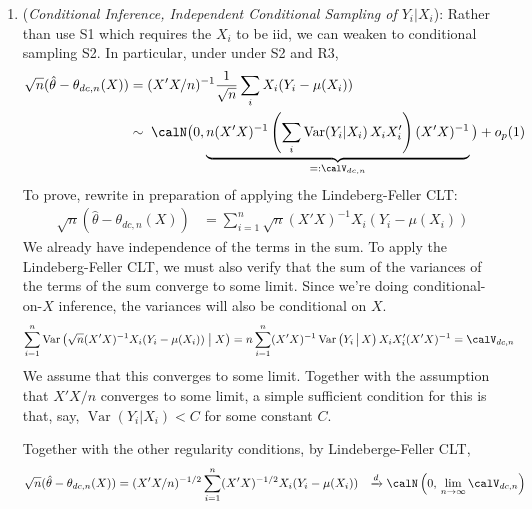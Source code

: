 \documentclass[12pt]{article}
\theoremstyle{plain}
\theoremstyle{definition}
\theoremstyle{remark}
\newcommand{\ra}{\rightarrow}
\newcommand{\Var}{\operatorname{Var}}
\newcommand{\dto}{\xrightarrow{d}}
\newcommand{\sumin}{\sum^n_{i=1}}
\begin{document}
\begin{enumerate}
  \item
    (\emph{Conditional Inference, Independent Conditional Sampling of $Y_i|X_i$}):
    Rather than use S1 which requires the $X_i$ to be iid, we can weaken
    to conditional sampling S2.
    In particular, under under S2 and R3,
    \begin{align*}
      \sqrt{n}(\hat{\theta}-\theta_{dc,n}(X))
      &=
      (X'X/n)^{-1}
      \frac{1}{\sqrt{n}}
      \sum_i
      X_i
        (Y_i-\mu(X_i))
      \\
      &\sim
      \;
      \calN\big(
        0,
        \underbrace{%
          n(X'X)^{-1}
          \left(
          \sum_i
          \Var(Y_i|X_i)\,X_iX_i'
          \right)
          (X'X)^{-1}
        }_{=:\calV_{dc,n}}
      \big)
      +
      o_p(1)
    \end{align*}
    To prove, rewrite in preparation of applying the Lindeberg-Feller
    CLT:
    \begin{align*}
      \sqrt{n}(\hat{\theta}-\theta_{dc,n}(X))
      &=
      \sumin
      \sqrt{n}
      (X'X)^{-1}
      X_i
      (Y_i-\mu(X_i))
    \end{align*}
    We already have independence of the terms in the sum.
    To apply the Lindeberg-Feller CLT, we must also verify that the sum
    of the variances of the terms of the sum converge to some limit.
    Since we're doing conditional-on-$X$ inference, the variances will
    also be conditional on $X$.
    \begin{align*}
      \sumin
      \Var\left(
      \sqrt{n}
      (X'X)^{-1}
      X_i
      (Y_i-\mu(X_i))
      \;\big|\;
      X
      \right)
      &=
      n
      \sumin
      (X'X)^{-1}
      \Var\left(
      Y_i
      \,\big|\,
      X
      \right)
      X_i
      X_i'
      (X'X)^{-1}
      =
      \calV_{dc,n}
    \end{align*}
    We assume that this converges to some limit.
    Together with the assumption that $X'X/n$ converges to some limit,
    a simple sufficient condition for this is that, say,
    $\Var(Y_i|X_i)<C$ for some constant $C$.

    Together with the other regularity conditions,
    by Lindeberge-Feller CLT,
    \begin{align*}
      \sqrt{n}(\hat{\theta}-\theta_{dc,n}(X))
      &=
      (X'X/n)^{-1/2}
      \sumin
      (X'X)^{-1/2}
      X_i
      (Y_i-\mu(X_i))
      &\dto
      \calN\left(
      0,\,
      \lim_{n\ra\infty}
      \calV_{dc,n}
      \right)
    \end{align*}


\end{enumerate}
\end{document}
